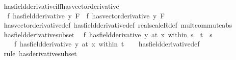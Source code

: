 \begin{isabellebody}
%
\endisadelimdocument
%
\isatagdocument
%
\isamarkuptrue%
%
\endisatagdocument
{\isafolddocument}%
%
\isadelimdocument
%
\endisadelimdocument
{}\isamarkupfalse%
\ has{\isacharunderscore}{\kern0pt}field{\isacharunderscore}{\kern0pt}derivative{\isacharunderscore}{\kern0pt}iff{\isacharunderscore}{\kern0pt}has{\isacharunderscore}{\kern0pt}vector{\isacharunderscore}{\kern0pt}derivative{\isacharcolon}{\kern0pt}\isanewline
\ \ {\isachardoublequoteopen}{\isacharparenleft}{\kern0pt}f\ has{\isacharunderscore}{\kern0pt}field{\isacharunderscore}{\kern0pt}derivative\ y{\isacharparenright}{\kern0pt}\ F\ {\isasymlongleftrightarrow}\ {\isacharparenleft}{\kern0pt}f\ has{\isacharunderscore}{\kern0pt}vector{\isacharunderscore}{\kern0pt}derivative\ y{\isacharparenright}{\kern0pt}\ F{\isachardoublequoteclose}\isanewline
%
\isadelimproof
\ \ %
\endisadelimproof
%
\isatagproof
{}\isamarkupfalse%
\ has{\isacharunderscore}{\kern0pt}vector{\isacharunderscore}{\kern0pt}derivative{\isacharunderscore}{\kern0pt}def\ has{\isacharunderscore}{\kern0pt}field{\isacharunderscore}{\kern0pt}derivative{\isacharunderscore}{\kern0pt}def\ real{\isacharunderscore}{\kern0pt}scaleR{\isacharunderscore}{\kern0pt}def\ mult{\isacharunderscore}{\kern0pt}commute{\isacharunderscore}{\kern0pt}abs\ \isacommand{{\isachardot}{\kern0pt}{\isachardot}{\kern0pt}}\isamarkupfalse%
%
\endisatagproof
{\isafoldproof}%
%
\isadelimproof
\isanewline
%
\endisadelimproof
\isanewline
{}\isamarkupfalse%
\ has{\isacharunderscore}{\kern0pt}field{\isacharunderscore}{\kern0pt}derivative{\isacharunderscore}{\kern0pt}subset{\isacharcolon}{\kern0pt}\isanewline
\ \ {\isachardoublequoteopen}{\isacharparenleft}{\kern0pt}f\ has{\isacharunderscore}{\kern0pt}field{\isacharunderscore}{\kern0pt}derivative\ y{\isacharparenright}{\kern0pt}\ {\isacharparenleft}{\kern0pt}at\ x\ within\ s{\isacharparenright}{\kern0pt}\ {\isasymLongrightarrow}\ t\ {\isasymsubseteq}\ s\ {\isasymLongrightarrow}\isanewline
\ \ \ \ {\isacharparenleft}{\kern0pt}f\ has{\isacharunderscore}{\kern0pt}field{\isacharunderscore}{\kern0pt}derivative\ y{\isacharparenright}{\kern0pt}\ {\isacharparenleft}{\kern0pt}at\ x\ within\ t{\isacharparenright}{\kern0pt}{\isachardoublequoteclose}\isanewline
%
\isadelimproof
\ \ %
\endisadelimproof
%
\isatagproof
{}\isamarkupfalse%
\ has{\isacharunderscore}{\kern0pt}field{\isacharunderscore}{\kern0pt}derivative{\isacharunderscore}{\kern0pt}def\ \isamarkupfalse%
\ {\isacharparenleft}{\kern0pt}rule\ has{\isacharunderscore}{\kern0pt}derivative{\isacharunderscore}{\kern0pt}subset{\isacharparenright}{\kern0pt}%

\end{isabellebody}
